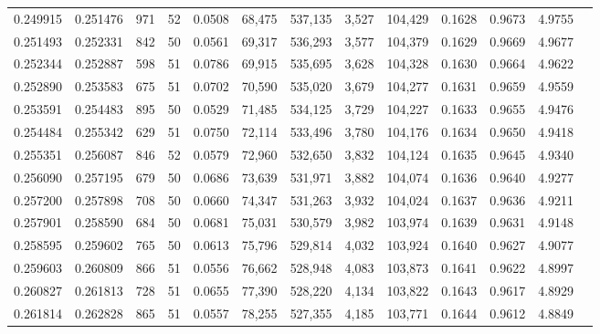 \begin{tabular}{rrrrrrrrrrrrr}
0.249915 & 0.251476 &   971 &  52 &                                     0.0508 &  68,475 & 537,135 &   3,527 & 104,429 & 0.1628 & 0.9673 & 4.9755 \\
0.251493 & 0.252331 &   842 &  50 &                                     0.0561 &  69,317 & 536,293 &   3,577 & 104,379 & 0.1629 & 0.9669 & 4.9677 \\
0.252344 & 0.252887 &   598 &  51 &                                     0.0786 &  69,915 & 535,695 &   3,628 & 104,328 & 0.1630 & 0.9664 & 4.9622 \\
0.252890 & 0.253583 &   675 &  51 &                                     0.0702 &  70,590 & 535,020 &   3,679 & 104,277 & 0.1631 & 0.9659 & 4.9559 \\
0.253591 & 0.254483 &   895 &  50 &                                     0.0529 &  71,485 & 534,125 &   3,729 & 104,227 & 0.1633 & 0.9655 & 4.9476 \\
0.254484 & 0.255342 &   629 &  51 &                                     0.0750 &  72,114 & 533,496 &   3,780 & 104,176 & 0.1634 & 0.9650 & 4.9418 \\
0.255351 & 0.256087 &   846 &  52 &                                     0.0579 &  72,960 & 532,650 &   3,832 & 104,124 & 0.1635 & 0.9645 & 4.9340 \\
0.256090 & 0.257195 &   679 &  50 &                                     0.0686 &  73,639 & 531,971 &   3,882 & 104,074 & 0.1636 & 0.9640 & 4.9277 \\
0.257200 & 0.257898 &   708 &  50 &                                     0.0660 &  74,347 & 531,263 &   3,932 & 104,024 & 0.1637 & 0.9636 & 4.9211 \\
0.257901 & 0.258590 &   684 &  50 &                                     0.0681 &  75,031 & 530,579 &   3,982 & 103,974 & 0.1639 & 0.9631 & 4.9148 \\
0.258595 & 0.259602 &   765 &  50 &                                     0.0613 &  75,796 & 529,814 &   4,032 & 103,924 & 0.1640 & 0.9627 & 4.9077 \\
0.259603 & 0.260809 &   866 &  51 &                                     0.0556 &  76,662 & 528,948 &   4,083 & 103,873 & 0.1641 & 0.9622 & 4.8997 \\
0.260827 & 0.261813 &   728 &  51 &                                     0.0655 &  77,390 & 528,220 &   4,134 & 103,822 & 0.1643 & 0.9617 & 4.8929 \\
0.261814 & 0.262828 &   865 &  51 &                                     0.0557 &  78,255 & 527,355 &   4,185 & 103,771 & 0.1644 & 0.9612 & 4.8849 \\

\end{tabular}
